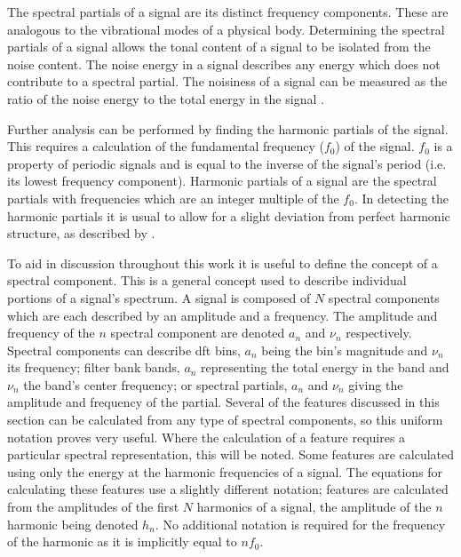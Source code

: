		The spectral partials of a signal are its distinct frequency components. These are analogous to the
		vibrational modes of a physical body. Determining the spectral partials of a signal allows the tonal
		content of a signal to be isolated from the noise content. The noise energy in a signal describes any
		energy which does not contribute to a spectral partial. The noisiness of a signal can be measured as the
		ratio of the noise energy to the total energy in the signal \citep{serra1998sound}.

		Further analysis can be performed by finding the harmonic partials of the signal. This requires a
		calculation of the fundamental frequency ($f_{0}$) of the signal. $f_{0}$ is a property of periodic signals
		and is equal to the inverse of the signal's period (i.e. its lowest frequency component). Harmonic partials
		of a signal are the spectral partials with frequencies which are an integer multiple of the $f_{0}$. In
		detecting the harmonic partials it is usual to allow for a slight deviation from perfect harmonic
		structure, as described by \citet{peeters2011the}.

		To aid in discussion throughout this work it is useful to define the concept of a spectral component. This
		is a general concept used to describe individual portions of a signal's spectrum. A signal is composed of
		$N$ spectral components which are each described by an amplitude and a frequency. The amplitude and
		frequency of the $n$ spectral component are denoted $a_{n}$ and $\nu_{n}$ respectively. Spectral
		components can describe \acrshort{dft} bins, $a_{n}$ being the bin's magnitude and $\nu_{n}$ its frequency;
		filter bank bands, $a_{n}$ representing the total energy in the band and $\nu_{n}$ the band's center
		frequency; or spectral partials, $a_{n}$ and $\nu_{n}$ giving the amplitude and frequency of the partial.
		Several of the features discussed in this section can be calculated from any type of spectral components,
		so this uniform notation proves very useful. Where the calculation of a feature requires a particular
		spectral representation, this will be noted. Some features are calculated using only the energy at the
		harmonic frequencies of a signal. The equations for calculating these features use a slightly different
		notation; features are calculated from the amplitudes of the first $N$ harmonics of a signal, the amplitude
		of the $n$ harmonic being denoted $h_{n}$. No additional notation is required for the frequency
		of the harmonic as it is implicitly equal to $nf_{0}$.

